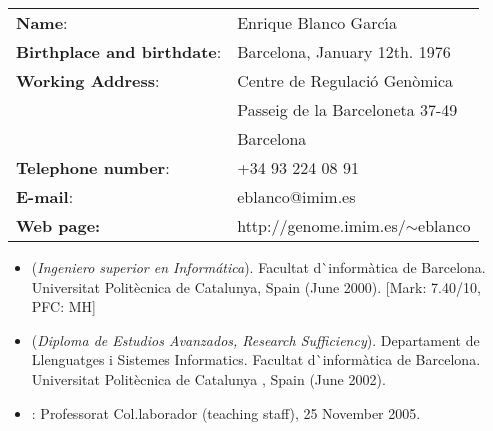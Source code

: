 
\newcommand{\cab}[1]{\hspace{-0cm}\textcolor{blue}{\rule{3mm}{3mm}{\Huge #1}}}
\newcommand{\subcab}[1]{\textcolor{blue}{{\Large #1}}}




\begin{tabular}{ll}
\textbf{Name}: &  Enrique Blanco Garc\'{\i}a\\
\textbf{Birthplace and birthdate}: &  Barcelona, January 12th. 1976\\
\textbf{Working Address}: &  Centre de Regulaci\'o Gen\`omica\\
 & Passeig de la Barceloneta 37-49\\
 & Barcelona\\
\textbf{Telephone number}: &  +34 93 224 08 91\\
\textbf{E-mail}: & eblanco@imim.es\\
\textbf{Web page:} & http://genome.imim.es/$\sim$eblanco\\[2ex]
\end{tabular}


\begin{itemize}
\item
{} (\emph{Ingeniero superior en Inform\'atica}). Facultat 
d\`{ }inform\`atica de Barcelona. Universitat Polit\`ecnica de Catalunya, Spain (June 2000).
[Mark: 7.40/10, PFC: MH]
\item 
{} (\emph{Diploma de Estudios Avanzados, Research Sufficiency}). 
Departament de Llenguatges i Sistemes Informatics. Facultat d\`{ }inform\`atica de Barcelona. 
Universitat Polit\`ecnica de Catalunya , Spain (June 2002).
\item
{}: Professorat Col.laborador (teaching staff), 25 November 2005.
\end{itemize}

